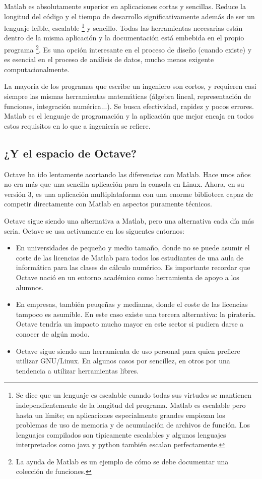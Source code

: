 Matlab es absolutamente superior en aplicaciones cortas y sencillas.
Reduce la longitud del código y el tiempo de desarrollo
significativamente además de ser un lenguaje leíble, escalable%
\footnote{Se dice que un lenguaje es escalable cuando todas sus
  virtudes se mantienen independientemente de la longitud del
  programa. Matlab es escalable pero hasta un límite; en aplicaciones
  especialmente grandes empiezan los problemas de uso de memoria y de
  acumulación de archivos de función. Los lenguajes compilados son
  típicamente escalables y algunos lenguajes interpretados como java y
  python también escalan perfectamente.%
} y sencillo. Todas las herramientas necesarias están dentro de la
misma aplicación y la documentación está embebida en el propio
programa%
\footnote{La ayuda de Matlab es un ejemplo de cómo se debe documentar
  una colección de funciones.%
}. Es una opción interesante en el proceso de diseño (cuando existe) y
es esencial en el proceso de análisis de datos, mucho menos exigente
computacionalmente.

La mayoría de los programas que escribe un ingeniero son cortos, y
requieren casi siempre las mismas herramientas matemáticas (álgebra
lineal, representación de funciones, integración numérica...). Se
busca efectividad, rapidez y pocos errores. Matlab es el lenguaje de
programación y la aplicación que mejor encaja en todos estos
requisitos en lo que a ingeniería se refiere.


\subsection{¿Y el espacio de Octave?}

Octave ha ido lentamente acortando las diferencias con Matlab. Hace
unos años no era más que una sencilla aplicación para la consola en
Linux.  Ahora, en su versión 3, es una aplicación multiplataforma con
una enorme biblioteca capaz de competir directamente con Matlab en
aspectos puramente técnicos.

Octave sigue siendo una alternativa a Matlab, pero una alternativa
cada día más seria.  Octave se usa activamente en los siguentes
entornos:

\begin{itemize}
\item En universidades de pequeño y medio tamaño, donde no se puede
  asumir el coste de las licencias de Matlab para todos los
  estudiantes de una aula de informática para las clases de cálculo
  numérico.  Es importante recordar que Octave nació en un entorno
  académico como herramienta de apoyo a los alumnos.
\item En empresas, también peuqeñas y medianas, donde el coste de las
  licencias tampoco es asumible.  En este caso existe una tercera
  alternativa: la piratería. Octave tendría un impacto mucho mayor en
  este sector si pudiera darse a conocer de algún modo.
\item Octave sigue siendo una herramienta de uso personal para quien
  prefiere utilizar GNU/Linux.  En algunos casos por sencillez, en
  otros por una tendencia a utilizar herramientas libres.
\end{itemize}

